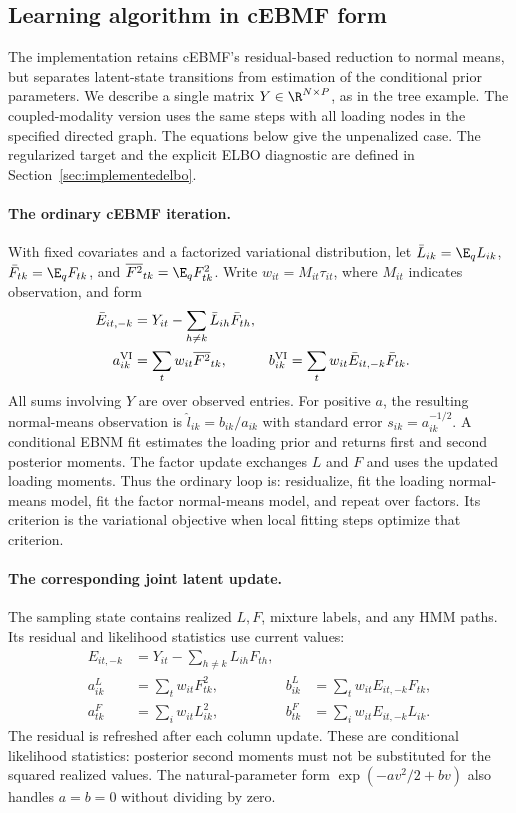 \subsection{Learning algorithm in cEBMF form}
\label{sec:learningalgorithm}
The implementation retains cEBMF's residual-based reduction to normal means,
but separates latent-state transitions from estimation of the conditional
prior parameters. We describe a single matrix \(Y\in\R^{N\times P}\), as in
the tree example. The coupled-modality version uses the same steps with all
loading nodes in the specified directed graph.
The equations below give the unpenalized case. The regularized target and
the explicit ELBO diagnostic are defined in Section~\ref{sec:implementedelbo}.

\paragraph{The ordinary cEBMF iteration.}
With fixed covariates and a factorized variational distribution, let
\(\bar L_{ik}=\E_q L_{ik}\), \(\bar F_{tk}=\E_q F_{tk}\), and
\(\overline{F^2}_{tk}=\E_q F_{tk}^2\). Write
\(w_{it}=M_{it}\tau_{it}\), where \(M_{it}\) indicates observation, and form
\begin{align}
\bar E_{it,-k}&=Y_{it}-\sum_{h\ne k}\bar L_{ih}\bar F_{th},\\
a^{\rm VI}_{ik}&=\sum_t w_{it}\overline{F^2}_{tk},&
b^{\rm VI}_{ik}&=\sum_t w_{it}\bar E_{it,-k}\bar F_{tk}.
\label{eq:algorithmvi}
\end{align}
All sums involving \(Y\) are over observed entries. For positive \(a\),
the resulting normal-means observation is \(\widehat l_{ik}=b_{ik}/a_{ik}\)
with standard error \(s_{ik}=a_{ik}^{-1/2}\). A conditional EBNM fit estimates
the loading prior and returns first and second posterior moments. The factor
update exchanges \(L\) and \(F\) and uses the updated loading moments.
Thus the ordinary loop is: residualize, fit the loading normal-means model,
fit the factor normal-means model, and repeat over factors. Its criterion is
the variational objective when local fitting steps optimize that criterion.

\paragraph{The corresponding joint latent update.}
The sampling state contains realized \(L,F\), mixture labels, and any HMM
paths. Its residual and likelihood statistics use current values:
\begin{align}
E_{it,-k}&=Y_{it}-\sum_{h\ne k}L_{ih}F_{th},\\
a^L_{ik}&=\sum_t w_{it}F_{tk}^2,&
b^L_{ik}&=\sum_t w_{it}E_{it,-k}F_{tk},
\label{eq:algorithmloadingstats}\\
a^F_{tk}&=\sum_i w_{it}L_{ik}^2,&
b^F_{tk}&=\sum_i w_{it}E_{it,-k}L_{ik}.
\label{eq:algorithmsamplingstats}
\end{align}
The residual is refreshed after each column update. These are conditional
likelihood statistics: posterior second moments must not be substituted
for the squared realized values. The natural-parameter form
\(\exp(-av^2/2+bv)\) also handles \(a=b=0\) without dividing by zero.

